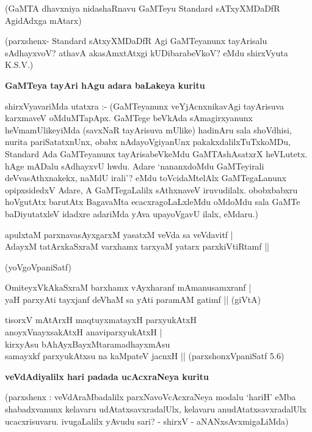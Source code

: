 \noindent
(GaMTA dhavxniya nidashaRnavu GaMTeyu {\rm Standard} sATxyXMDaDfR AgidAdxga mAtarx)

(parxshenx- {\rm Standard} sAtxyXMDaDfR Agi GaMTeyanunx tayArisalu sAdhayxvoV? athavA akasAmx\-tAtxgi kUDibarabeVkoV? eMdu shirxVyuta {\rm K.S.V.})

{\bigskip
\noindent
{\large\bf GaMTeya tayAri hAgu adara baLakeya kuritu}}\label{page170}
\medskip

\noindent
shirxVyavariMda utatxra :- (GaMTeyanunx veYjAcnxnikavAgi tayArisuva karxmaveV oMduMTapApx. GaMTege beVkAda sAmagirxyanunx heVmamUlikeyiMda (savxNaR tayArisuva mUlike) hadinAru sala shoVdhisi,\- nurita pariSatatxnUnx, obabx nAdayoVgiyanUnx pakakxdalilxTuTxkoMDu, {\rm Standard} Ada GaMTeyanunx tayA\-risabeVkeMdu GaMTAshAsatxrX heVLutetx. hAge mADalu sAdhayxvU hwdu. Adare `nananxdoMdu GaMTeyirali deVvasAthxnakekx, naMdU irali'? eMdu toVcidaMtelAlx GaMTegaLanunx opipxsidedxV Adare, A GaMTegaLalilx sAthxnaveV iruvudilalx. obobxbabxru hoVgutAtx barutAtx BagavaMta ecacxragoLaLxleMdu oMdoMdu sala GaMTe baDiyutatxleV idadxre adariMda yAva upayoVgavU ilalx, eMdaru.)
\begin{itemize}
{\bf 
\item[30.] apulxtaM parxnavasAyxgarxM yasatxM veVda sa veVdavitf |\\\label{148}
AdayxM tatArxkaSxraM varxhamx tarxyaM yatarx parxkiVtiRtamf ||

\hfill{(yoVgoVpaniSatf)}
\item[31.] OmiteyxVkAkaSxraM barxhamx vAyxharanf mAmanusamxranf |\\\label{148}
yaH parxyAti tayxjanf deVhaM sa yAti paramAM gatimf ||
\hfill{(giVtA)}
\item[32.] tisorxV mAtArxH maqtuyxmatayxH parxyukAtxH\\\label{148}
anoyxVnayxsakAtxH anaviparxyukAtxH |\\
kirxyAsu bAhAyxBayxMtaramadhayxmAsu\\
samayxkf parxyukAtxsu na kaMpateV jacnxH ||
\hfill{(parxshonxVpaniSatf 5.6)}}
\end{itemize}

\newpage

{\bigskip
\noindent
{\large\bf veVdAdiyalilx hari padada ucAcxraNeya kuritu}}\label{page149}
\medskip

\noindent
(parxshenx : veVdAraMbadalilx parxNavoVcAcxraNeya modalu `hariH' eMba shabadxvanunx kelavaru udAtatxsavxra\-dalUlx, kelavaru anudAtatxsavxradalUlx ucacxrisuvaru. ivuga\-Lalilx yAvudu sari? - shirxV - aNANxsAvxmi\-gaLiMda)

